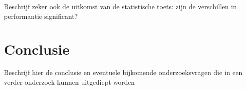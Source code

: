\documentclass[fleqn,10pt]{artikeltin}
\begin{document}
Beschrijf zeker ook de uitkomst van de statistische toets: zijn de verschillen in performantie significant?

\section{Conclusie}
\label{sec:conclusie}

Beschrijf hier de conclusie en eventuele bijkomende onderzoeksvragen die in een verder onderzoek kunnen uitgediept worden


\printbibliography[heading=bibintoc]
\end{document}
